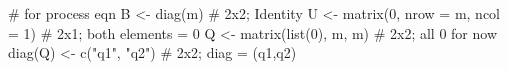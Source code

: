 \begin{Schunk}
\begin{Sinput}
 # for process eqn
 B <- diag(m) # 2x2; Identity
 U <- matrix(0, nrow = m, ncol = 1) # 2x1; both elements = 0
 Q <- matrix(list(0), m, m) # 2x2; all 0 for now
 diag(Q) <- c("q1", "q2") # 2x2; diag = (q1,q2)
\end{Sinput}
\end{Schunk}
